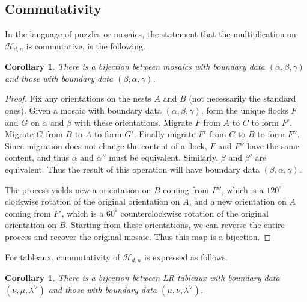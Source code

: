 \documentclass[12pt]{article}
\newcommand{\ringH}{\mathcal{H}_{d,n}}
\newtheorem{corollary}[lemma]{Corollary}
\begin{document}

\subsection{Commutativity}
In the language of puzzles or mosaics, the statement that the 
multiplication on $\ringH$ is commutative, is the following.

\begin{corollary}
\label{cor:mosaiccommute}
There is a bijection between mosaics with boundary data
$(\alpha, \beta, \gamma)$ and those with boundary data
$(\beta, \alpha, \gamma)$.
\end{corollary}

\begin{proof}
Fix any orientations on the nests $A$ and $B$ (not necessarily the
standard ones).  Given a mosaic with boundary data 
$(\alpha, \beta, \gamma)$, form the unique flocks $F$ and
$G$ on $\alpha$ and $\beta$ 
with these orientations.  Migrate
$F$ from $A$ to $C$ to form $F'$.  Migrate $G$ from
$B$ to $A$ to form $G'$.  Finally migrate $F'$ from $C$ to $B$ to
form $F''$.  Since migration does not change the content of
a flock, $F$ and $F''$ have the same content, and thus
$\alpha$ and $\alpha''$ must be equivalent.  Similarly, $\beta$ and 
$\beta'$ are equivalent.  Thus the result of this operation will
have boundary data $(\beta, \alpha, \gamma)$.

The process yields new a orientation on $B$ coming from $F''$,
which is a $120^\circ$ clockwise rotation of the original orientation 
on $A$, and a new orientation on $A$ coming from $F'$, which is
a $60^\circ$ counterclockwise rotation of the original orientation on $B$.
Starting from these orientations, we can reverse the entire process
and recover the original mosaic.  Thus this map is a bijection.
\end{proof}

For tableaux, commutativity of $\ringH$ is expressed as follows.

\begin{corollary}
\label{cor:tableaucommute}
There is a bijection between LR-tableaux with boundary data 
$(\nu, \mu, \lambda^\vee)$ and those with boundary data
$(\mu, \nu, \lambda^\vee)$.
\end{corollary}
\end{document}
